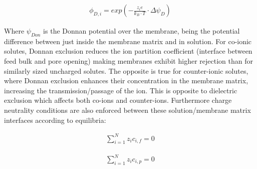 
\begin{ceqn}
    \begin{align}
   \phi_{D,i}=exp\left(-\frac{z_i e}{k_B \cdot T}\cdot \Delta\psi_D\right)
    \end{align} 
 \end{ceqn}

Where $\psi_{Don}$ is the Donnan potential over the membrane, being the potential difference between just inside the membrane matrix and in solution. 
For co-ionic solutes, Donnan exclusion reduces the ion partition coefficient (interface between feed bulk and pore opening) making membranes exhibit higher rejection than for similarly sized uncharged solutes.
The opposite is true for counter-ionic solutes, where Donnan exclusion enhances their concentration in the membrane matrix, increasing the transmission/passage of the ion. \citep{nanofiltration_2021_bog_fraMorten}
This is opposite to dielectric exclusion which affects both co-ions and counter-ions. \citep{wangPoreModelNanofiltration2021}
Furthermore charge neutrality conditions are also enforced between these solution/membrane matrix interfaces according to equilibria: \citep{wangPoreModelNanofiltration2021}

\begin{ceqn} 
    \begin{align}
     \sum_{i=1}^{N} z_ic_{i,f}  = 0 
              \label{eq:neutrality_feed}
    \end{align} 
\end{ceqn}  

\begin{ceqn} 
    \begin{align}
     \sum_{i=1}^{N} z_ic_{i,p}  = 0 
              \label{eq:neutrality_permeate}
    \end{align} 
\end{ceqn}  


